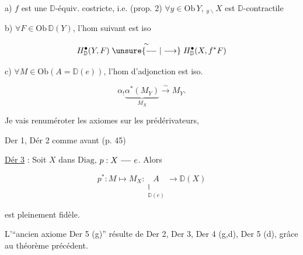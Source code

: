 a) $f$ est une $\mathbb D$-équiv. costricte, i.e. (prop. 2) $\forall y\in\mathrm{Ob}\,Y$, $ {}_{y\backslash}X$ est $\mathbb D$-contractile

b) $\forall F\in\mathrm{Ob}\,\mathbb D(Y)$, l'hom suivant est iso

\[ H^\bullet_{\mathbb D}(Y,F)\mathrel{\overset{\sim}{\unsure{\relbar\joinrel\relbar|\longrightarrow}}}H^\bullet_{\mathbb D}(X,f^*F) \]

c) $\forall M\in\mathrm{Ob}(A=\mathbb D(e))$, l'hom d'adjonction est iso.

\[ \alpha_!\underbrace{\alpha^*(M_Y)}_{M_X}\xrightarrow{\sim}M_Y. \]

Je vais renuméroter les  axiomes sur les prédérivateurs,

Der 1, Dér 2 comme avant (p. 45)


\uline{Dér 3} : Soit $X$ dans $\mathrm{Diag}$, $p:X\mathrel{\relbar\joinrel\relbar}e$.  Alors

\[ p^*:M\longmapsto M_X:\underset{\substack{\Vert\\\mathbb D(e)}}{A}\longrightarrow\mathbb D(X) \]

est pleinement fidèle.





L'``ancien axiome Der 5 (g)'' résulte de Der 2, Der 3, Der 4 (g,d), Der 5 (d), grâce au théorème précédent.


